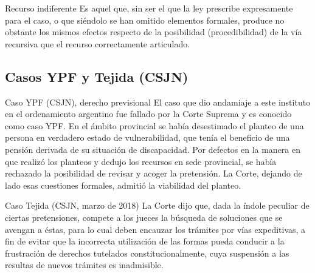 \documentclass[12pt,oneside]{book}
\begin{document}
\begin{definition}{Recurso indiferente}
Es aquel que, sin ser el que la ley prescribe expresamente para el caso, o que siéndolo se han omitido elementos formales, produce no obstante los mismos efectos respecto de la posibilidad (procedibilidad) de la vía recursiva que el recurso correctamente articulado.
\end{definition}

\subsection{Casos YPF y Tejida (CSJN)}

\begin{example}{Caso YPF (CSJN), derecho previsional}
El caso que dio andamiaje a este instituto en el ordenamiento argentino fue fallado por la Corte Suprema y es conocido como caso YPF. En el ámbito provincial se había desestimado el planteo de una persona en verdadero estado de vulnerabilidad, que tenía el beneficio de una pensión derivada de su situación de discapacidad. Por defectos en la manera en que realizó los planteos y dedujo los recursos en sede provincial, se había rechazado la posibilidad de revisar y acoger la pretensión. La Corte, dejando de lado esas cuestiones formales, admitió la viabilidad del planteo.
\end{example}

\begin{example}{Caso Tejida (CSJN, marzo de 2018)}
La Corte dijo que, dada la índole peculiar de ciertas pretensiones, compete a los jueces la búsqueda de soluciones que se avengan a éstas, para lo cual deben encauzar los trámites por vías expeditivas, a fin de evitar que la incorrecta utilización de las formas pueda conducir a la frustración de derechos tutelados constitucionalmente, cuya suspensión a las resultas de nuevos trámites es inadmisible.
\end{example}
\end{document}
